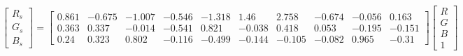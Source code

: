 \begin{equation}
\begin{bmatrix}
  R_s \\ G_s \\ B_s 
\end{bmatrix}=
\left[\begin{matrix}0.861 & -0.675 & -1.007 & -0.546 & -1.318 & 1.46 & 2.758 & -0.674 & -0.056 & 0.163\\ 
0.363 & 0.337 & -0.014 & -0.541 & 0.821 & -0.038 & 0.418 & 0.053 & -0.195 & -0.151\\ 
0.24 & 0.323 & 0.802 & -0.116 & -0.499 & -0.144 & -0.105 & -0.082 & 0.965 & -0.31\end{matrix}\right]
\begin{bmatrix}
  R \\ G \\ B \\ 1 
\end{bmatrix}
\end{equation}
